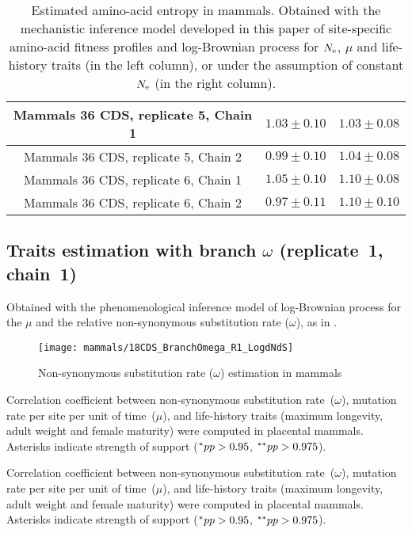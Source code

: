 \begin{table}[H]
{\begin{tabu}{|c|c|c|}
            Mammals 36 {CDS}, replicate 5, Chain 1 & $1.03 \pm 0.10$ & $1.03 \pm 0.08$\\ \hline
            Mammals 36 {CDS}, replicate 5, Chain 2 & $0.99 \pm 0.10$ & $1.04 \pm 0.08$\\ \hline
            Mammals 36 {CDS}, replicate 6, Chain 1 & $1.05 \pm 0.10$ & $1.10 \pm 0.08$\\ \hline
            Mammals 36 {CDS}, replicate 6, Chain 2 & $0.97 \pm 0.11$ & $1.10 \pm 0.10$\\ \hline
        \end{tabu}}
    \caption[Entropy of amino acids in mammals]{Estimated amino-acid entropy in mammals.
    Obtained with the mechanistic inference model developed in this paper of site-specific amino-acid fitness profiles and log-Brownian process for $N_{\text{e}}$, $\mu$ and life-history traits (in the left column), or under the assumption of constant $N_{\text{e}}$ (in the right column).}
    \label{tab:table-entropy-aa-mutselne}
\end{table}

\subsection{Traits estimation with branch \texorpdfstring{$\omega$}{ω} (replicate~1, chain~1)}
Obtained with the phenomenological inference model of log-Brownian process for the $\mu$ and the relative {non-synonymous} {substitution} rate ($\omega$), as in \citet{Lartillot2011}.

\begin{figure}[H]
    \centering
    \texttt{[image: mammals/18CDS\_BranchOmega\_R1\_LogdNdS]}
    \caption[$\omega$ estimation in mammals]{{Non-synonymous substitution} rate ($\omega$) estimation in mammals}
\end{figure}

\begin{table}[H]
    
    \caption[Correlation coefficient matrix in mammals ($\omega$)]{
        Correlation coefficient between {non-synonymous} {substitution} rate~($\omega$), mutation rate per site per unit of time~($\mu$), and life-history traits (maximum longevity, adult weight and female maturity) were computed in placental mammals.
        Asterisks indicate strength of support ($\smash{^{*}} pp > 0.95$, $\smash{^{**}} pp > 0.975$).}
\end{table}

\begin{table}[H]
    
    \caption[Covariance matrix in mammals ($\omega$)]{
        Correlation coefficient between {non-synonymous} {substitution} rate~($\omega$), mutation rate per site per unit of time~($\mu$), and life-history traits (maximum longevity, adult weight and female maturity) were computed in placental mammals.
        Asterisks indicate strength of support ($\smash{^{*}} pp > 0.95$, $\smash{^{**}} pp > 0.975$).}
\end{table}


